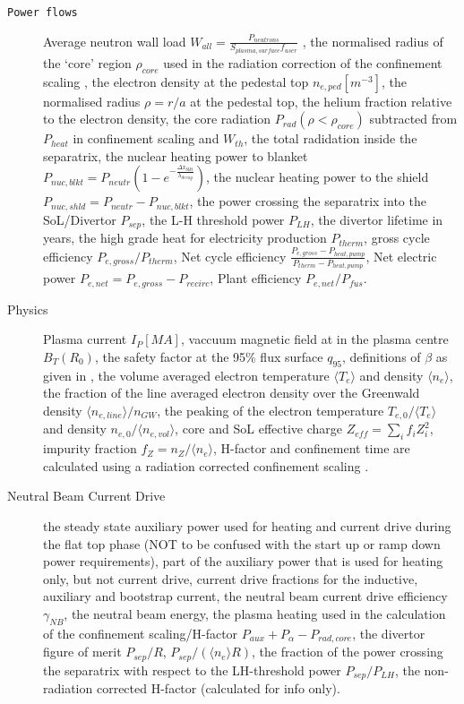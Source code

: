 \documentclass[11pt,a4paper]{article}
\begin{document}
\begin{description}
\item[\texttt{Power flows}] Average neutron wall load $W_{all}=\frac{P_{neutrons}}{S_{plasma,surface}f_{user}}$ \cite{kovari_eng}, the normalised radius of the `core' region $\rho_{core}$ used in the radiation correction of the confinement scaling \cite{hanni_radiation,Lux2016}, the electron density at the pedestal top $n_{e,ped}[m^{-3}]$, the normalised radius $\rho=r/a$ at the pedestal top, the helium fraction relative to the electron density, the core radiation $P_{rad} (\rho<\rho_{core})$ subtracted from $P_{heat}$ in confinement scaling and $W_{th}$, the total radidation inside the separatrix, the nuclear heating power to blanket $P_{nuc,blkt}= P_{neutr} (1-e^{-\frac{\Delta x_{blkt}}{\lambda_{decay}}})$, the nuclear heating power to the shield $P_{nuc,shld}=P_{neutr}-P_{nuc,blkt}$, the power crossing the separatrix into the SoL/Divertor $P_{sep}$, the L-H threshold power $P_{LH}$, the divertor lifetime in years, the high grade heat for electricity production $P_{therm}$, gross cycle efficiency $P_{e,gross}/P_{therm}$, Net cycle efficiency $\frac{P_{e,gross}-P_{heat,pump}}{P_{therm}-P_{heat,pump}}$, Net electric power $P_{e,net}=P_{e,gross}-P_{recirc}$, Plant efficiency $P_{e,net}/P_{fus}$.
\item[Physics] Plasma current $I_P[MA]$, vaccuum magnetic field at in the plasma centre $B_T(R_0)$, the safety factor at the 95\% flux surface $q_{95}$, definitions of $\beta$ as given in \cite{kovari_physics}, the volume averaged electron temperature $\langle T_e\rangle$ and density $\langle n_e\rangle$, the fraction of the line averaged electron density over the Greenwald density $\langle n_{e,line}\rangle / n_{GW}$, the peaking of the electron temperature $T_{e,0}/\langle T_e\rangle$ and density  $n_{e,0}/\langle n_{e,vol}\rangle$, core and SoL effective charge $Z_{eff}=\sum_i f_iZ_i^2$, impurity fraction $f_Z=n_Z/\langle n_e\rangle$, H-factor and confinement time are calculated using a radiation corrected confinement scaling \cite{hanni_radiation, Lux2016}.
\item[Neutral Beam Current Drive] the steady state auxiliary power used for heating and current drive during the flat top phase (NOT to be confused with the start up or ramp down power requirements), part of the auxiliary power that is used for heating only, but not current drive, current drive fractions for the inductive, auxiliary and bootstrap current, the neutral beam current drive efficiency $\gamma_{NB}$, the neutral beam energy, the plasma heating used in the calculation of the confinement scaling/H-factor $P_{aux} + P_\alpha - P_{rad,core}$, the divertor figure of merit $P_{sep}/R$, $P_{sep}/(\langle n_e\rangle R)$,
the fraction of the power crossing the separatrix with respect to the LH-threshold power $P_{sep}/P_{LH}$, the non-radiation corrected H-factor (calculated for info only).
\end{description}
\end{document}
